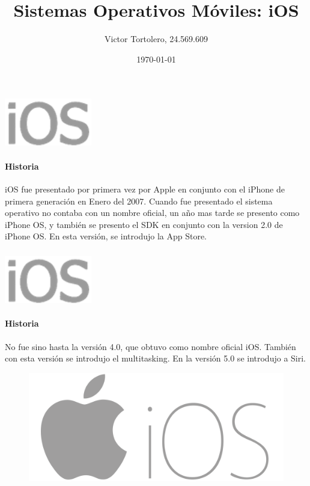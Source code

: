 \documentclass{beamer}
\title{Sistemas Operativos Móviles: iOS}
\author{Victor Tortolero, 24.569.609}
\institute{
	Sistemas Operativos, FACYT
}
\date{\today}
\newcommand*{\ioslogo}{\includegraphics[scale=0.25]{img/logo2.png} \ }%
\begin{document}

\begin{frame}
	\titlepage
\end{frame}

\begin{frame}
\frametitle{\ioslogo}
\framesubtitle{Historia}

iOS fue presentado por primera vez por Apple en conjunto con el iPhone de primera generación en Enero del 2007. Cuando fue presentado el sistema operativo no contaba con un nombre oficial, un año mas tarde se presento como iPhone OS, y también se presento el SDK en conjunto con la version 2.0 de iPhone OS. En esta versión, se introdujo la App Store.

\end{frame}

\begin{frame}
\frametitle{\ioslogo}
\framesubtitle{Historia}

	No fue sino hasta la versión 4.0, que obtuvo como nombre oficial iOS. También con esta versión se introdujo el multitasking. En la versión 5.0 se introdujo a Siri.
	
	\vfill
	\begin{figure}[h]
		\centering
		\includegraphics[scale=0.07]{img/ios_logo_gray.png}
	\end{figure}
\end{frame}
\end{document}
